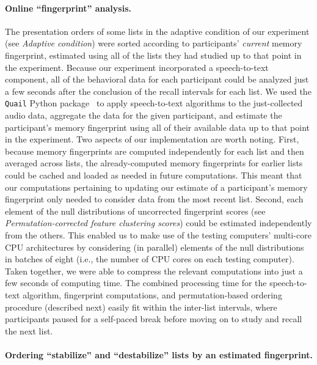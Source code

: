 \documentclass[11pt]{article}
\begin{document}
\paragraph{Online ``fingerprint'' analysis.}

The presentation orders of some lists in the adaptive condition of our
experiment (see \textit{Adaptive condition}) were sorted according to
participants' \textit{current} memory fingerprint, estimated using all of the
lists they had studied up to that point in the experiment. Because our
experiment incorporated a speech-to-text component, all of the behavioral data
for each participant could be analyzed just a few seconds after the conclusion
of the recall intervals for each list. We used the \texttt{Quail} Python
package~\citep{HeusEtal17} to apply speech-to-text algorithms to the
just-collected audio data, aggregate the data for the given participant, and estimate
the participant's memory fingerprint using all of their available data up to
that point in the experiment. Two aspects of our implementation are worth
noting. First, because memory fingerprints are computed independently for each
list and then averaged across lists, the already-computed memory fingerprints
for earlier lists could be cached and loaded as needed in future computations.
This meant that our computations pertaining to updating our estimate of a
participant's memory fingerprint only needed to consider data from the most
recent list. Second, each element of the null distributions of uncorrected
fingerprint scores (see \textit{Permutation-corrected feature clustering
scores}) could be estimated independently from the others. This enabled us to
make use of the testing computers' multi-core CPU architectures by considering
(in parallel) elements of the null distributions in batches of eight (i.e., the
number of CPU cores on each testing computer). Taken together, we were able to
compress the relevant computations into just a few seconds of computing time.
The combined processing time for the speech-to-text algorithm, fingerprint
computations, and permutation-based ordering procedure (described next) easily
fit within the inter-list intervals, where participants paused for a self-paced
break before moving on to study and recall the next list.

\paragraph{Ordering ``stabilize'' and ``destabilize'' lists by an estimated
fingerprint.}
\end{document}
